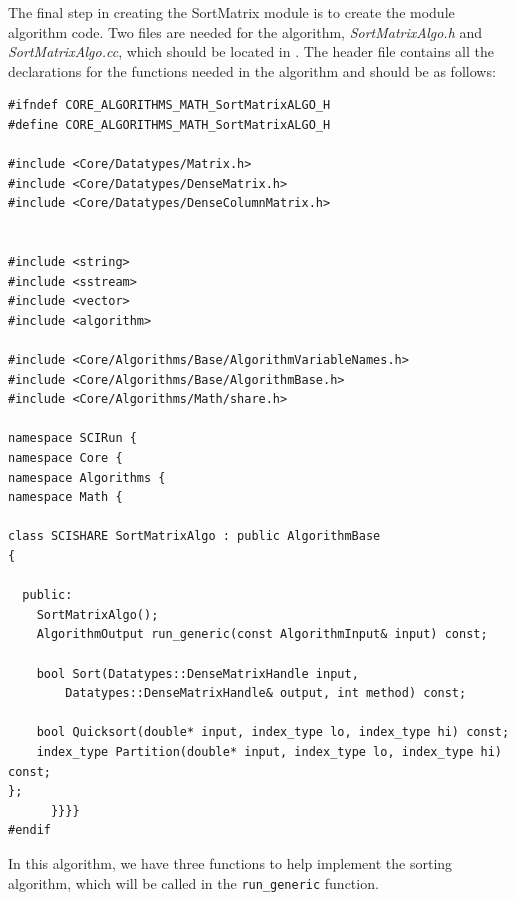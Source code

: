 \documentclass[fleqn,11pt,openany]{book}
\begin{document}
The final step in creating the SortMatrix module is to create the module algorithm code.  
Two files are needed for the algorithm, \emph{SortMatrixAlgo.h} and \emph{SortMatrixAlgo.cc}, which should be located in \emph{}. 
The header file contains all the declarations for the functions needed in the algorithm and should be as follows:
\begin{verbatim}
#ifndef CORE_ALGORITHMS_MATH_SortMatrixALGO_H
#define CORE_ALGORITHMS_MATH_SortMatrixALGO_H

#include <Core/Datatypes/Matrix.h>
#include <Core/Datatypes/DenseMatrix.h>
#include <Core/Datatypes/DenseColumnMatrix.h>


#include <string>
#include <sstream>
#include <vector>
#include <algorithm>

#include <Core/Algorithms/Base/AlgorithmVariableNames.h>
#include <Core/Algorithms/Base/AlgorithmBase.h>
#include <Core/Algorithms/Math/share.h>

namespace SCIRun {
namespace Core {
namespace Algorithms {
namespace Math {

class SCISHARE SortMatrixAlgo : public AlgorithmBase
{

  public:
    SortMatrixAlgo();
    AlgorithmOutput run_generic(const AlgorithmInput& input) const;
  
    bool Sort(Datatypes::DenseMatrixHandle input, 
        Datatypes::DenseMatrixHandle& output, int method) const;
  
    bool Quicksort(double* input, index_type lo, index_type hi) const;
    index_type Partition(double* input, index_type lo, index_type hi) const;
};
      }}}}
#endif
\end{verbatim}
In this algorithm, we have three functions to help implement the sorting algorithm, which will be called in the \verb|run_generic| function.  
\end{document}
